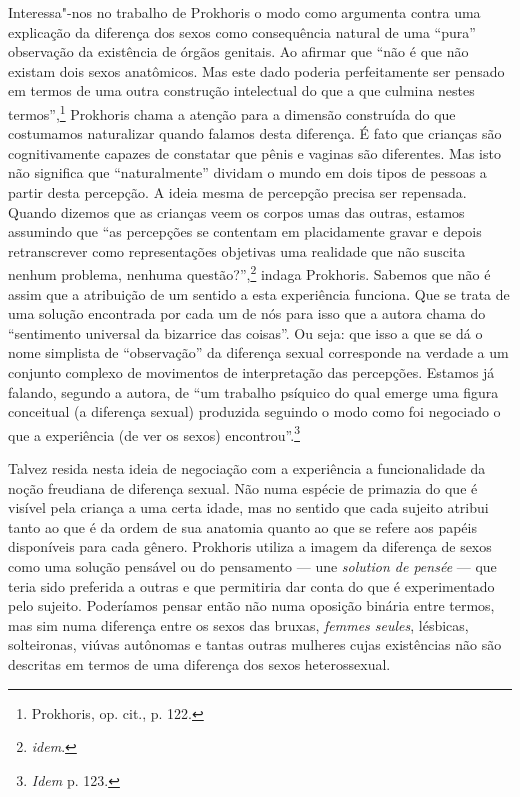 Interessa"-nos no trabalho de Prokhoris o modo como argumenta contra uma
explicação da diferença dos sexos como consequência natural de uma
``pura'' observação da existência de órgãos genitais. Ao afirmar que
``não é que não existam dois sexos anatômicos. Mas este dado poderia
perfeitamente ser pensado em termos de uma outra construção intelectual
do que a que culmina nestes termos'',\footnote{Prokhoris, op. cit., p.
  122.} Prokhoris chama a atenção para a dimensão construída do que
costumamos naturalizar quando falamos desta diferença. É fato que
crianças são cognitivamente capazes de constatar que pênis e vaginas são
diferentes. Mas isto não significa que ``naturalmente'' dividam o mundo
em dois tipos de pessoas a partir desta percepção. A ideia mesma de
percepção precisa ser repensada. Quando dizemos que as crianças veem os
corpos umas das outras, estamos assumindo que ``as percepções se
contentam em placidamente gravar e depois retranscrever como
representações objetivas uma realidade que não suscita nenhum problema,
nenhuma questão?'',\footnote{\emph{idem}.} indaga Prokhoris. Sabemos que
não é assim que a atribuição de um sentido a esta experiência funciona.
Que se trata de uma solução encontrada por cada um de nós para isso que
a autora chama do ``sentimento universal da bizarrice das coisas''. Ou
seja: que isso a que se dá o nome simplista de ``observação'' da
diferença sexual corresponde na verdade a um conjunto complexo de
movimentos de interpretação das percepções. Estamos já falando, segundo
a autora, de ``um trabalho psíquico do qual emerge uma figura conceitual
(a diferença sexual) produzida seguindo o modo como foi negociado o que
a experiência (de ver os sexos) encontrou''.\footnote{\emph{Idem} p. 123.}

Talvez resida nesta ideia de negociação com a experiência a
funcionalidade da noção freudiana de diferença sexual. Não numa espécie
de primazia do que é visível pela criança a uma certa idade, mas no
sentido que cada sujeito atribui tanto ao que é da ordem de sua anatomia
quanto ao que se refere aos papéis disponíveis para cada gênero.
Prokhoris utiliza a imagem da diferença de sexos como uma solução
pensável ou do pensamento --- une \emph{solution de pensée} --- que teria
sido preferida a outras e que permitiria dar conta do que é
experimentado pelo sujeito. Poderíamos pensar então não numa oposição
binária entre termos, mas sim numa diferença entre os sexos das bruxas,
\emph{femmes seules}, lésbicas, solteironas, viúvas autônomas e tantas
outras mulheres cujas existências não são descritas em termos de uma
diferença dos sexos heterossexual.


